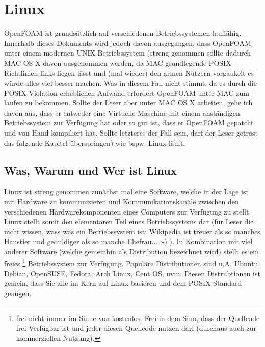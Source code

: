 \chapter{Linux}

OpenFOAM ist grundsätzlich auf verschiedenen Betriebssystemen lauffähig. Innerhalb dieses Dokuments wird jedoch davon ausgegangen, dass OpenFOAM unter einem modernen UNIX Betriebssystem (streng genommen sollte dadurch MAC OS X davon ausgenommen werden, da MAC grundlegende POSIX-Richtlinien links liegen lässt und (mal wieder) den armen Nutzern vorgaukelt es würde alles viel besser machen. Was in diesem Fall nicht stimmt, da es durch die POSIX-Violation erheblichen Aufwand erfordert OpenFOAM unter MAC zum laufen zu bekommen. Sollte der Leser aber unter MAC OS X arbeiten, gehe ich davon aus, dass er entweder eine Virtuelle Maschine mit einem anständigen Betriebssystem zur Verfügung hat oder so gut ist, dass er OpenFOAM gepatcht und von Hand kompiliert hat. Sollte letzteres der Fall sein, darf der Leser getrost das folgende Kapitel überspringen) wie bspw. Linux läuft. 
\\
\section{Was, Warum und Wer ist Linux}
Linux ist streng genommen zunächst mal eine Software, welche in der Lage ist mit Hardware zu kommunizieren und Kommunikationskanäle zwischen den verschiedenen Hardwarekomponenten eines Computers zur Verfügung zu stellt. Linux stellt somit den elementaren Teil eines Betriebssystems dar (für Leser die \underline{nicht} wissen, wass was ein Betriebssystem ist; Wikipedia ist treuer als so manches Haustier und geduldiger als so manche Ehefrau... ;-) ). In Kombination mit viel anderer Software (welche gemeinhin als Distribution bezeichnet wird) stellt es ein freies \footnote{frei nicht immer im Sinne von kostenlos. Frei in dem Sinn, dass der Quellcode frei Verfügbar ist und jeder diesen Quellcode nutzen darf (durchaus auch zur kommerziellen Nutzung).} Betriebssystem zur Verfügung. Populäre Distributionen sind u.A. Ubuntu, Debian, OpenSUSE, Fedora, Arch Linux, Cent OS, uvm. Diesen Distrubtionen ist gemein, dass Sie alle im Kern auf Linux basieren und dem POSIX-Standard genügen.

